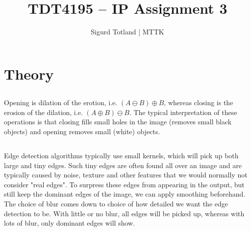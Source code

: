 \documentclass[]{article}
\title{TDT4195 – IP Assignment 3}
\author{Sigurd Totland | MTTK}
\begin{document}
\maketitle

\section{Theory}
\subsection{}
Opening is dilation of the erotion, i.e. $(A \ominus B) \oplus B$, whereas closing is the erosion of the dilation, i.e. $(A \oplus B) \ominus B$. The typical interpretation of these operations is that closing fills small holes in the image (removes small black objects) and opening removes small (white) objects.

\subsection{}
Edge detection algorithms typically use small kernels, which will pick up both large and tiny edges. Such tiny edges are often found all over an image and are typically caused by noise, texture and other features that we would normally not consider "real edges". To surpress these edges from appearing in the output, but still keep the dominant edges of the image, we can apply smoothing beforehand. The choice of blur comes down to choice of how detailed we want the edge detection to be. With little or no blur, all edges will be picked up, whereas with lots of blur, only dominant edges will show.

\subsection{}
\end{document}
